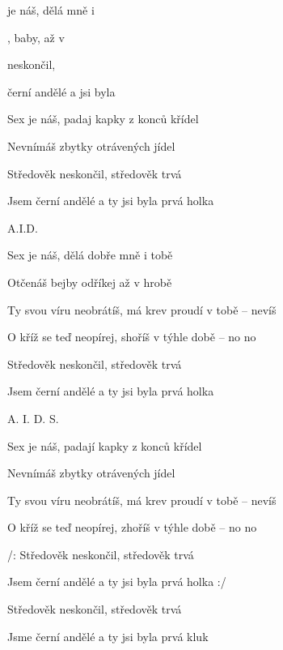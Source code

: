 

           

\zs
{} je náš, dělá  mně i 

, baby,  až v 

 neskončil,  

 černí andělé a  jsi byla     
\ks

\zs
Sex je náš, padaj kapky z konců křídel

Nevnímáš zbytky otrávených jídel

Středověk neskončil, středověk trvá

Jsem černí andělé a ty jsi byla prvá holka
\ks

A.I.D.

\zs
Sex je náš, dělá dobře mně i tobě

Otčenáš bejby odříkej až v hrobě

Ty svou víru neobrátíš, má krev proudí v tobě -- nevíš

O kříž se teď neopírej, shoříš v týhle době -- no no

Středověk neskončil, středověk trvá

Jsem černí andělé a ty jsi byla prvá holka
\ks

A. I. D. S.

\zs
Sex je náš, padají kapky z konců křídel

Nevnímáš zbytky otrávených jídel

Ty svou víru neobrátíš, má krev proudí v tobě -- nevíš

O kříž se teď neopírej, zhoříš v týhle době -- no no

/: Středověk neskončil, středověk trvá

Jsem černí andělé a ty jsi byla prvá holka :/

Středověk neskončil, středověk trvá

Jsme černí andělé a ty jsi byla prvá kluk
\ks

\kp






